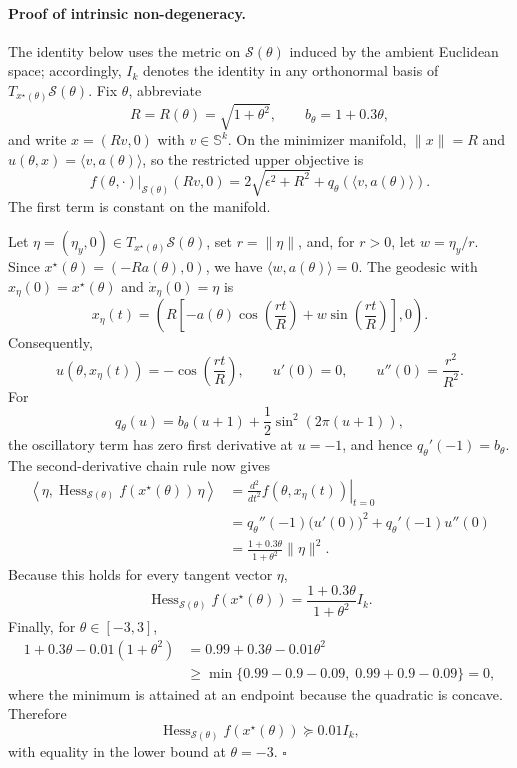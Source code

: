 \paragraph{Proof of intrinsic non-degeneracy.}
The identity below uses the metric on \(\mathcal S(\theta)\) induced by the
ambient Euclidean space; accordingly, \(I_k\) denotes the identity in any
orthonormal basis of
\(T_{x^\star(\theta)}\mathcal S(\theta)\).  Fix \(\theta\), abbreviate
\[
R=R(\theta)=\sqrt{1+\theta^2},
\qquad
b_\theta=1+0.3\theta,
\]
and write \(x=(Rv,0)\) with \(v\in\mathbb S^k\).  On the minimizer
manifold, \(\lVert x\rVert=R\) and
\(u(\theta,x)=\langle v,a(\theta)\rangle\), so the restricted upper objective
is
\[
\left.f(\theta,\cdot)\right|_{\mathcal S(\theta)}(Rv,0)
=2\sqrt{\epsilon^2+R^2}
+q_\theta\!\left(\langle v,a(\theta)\rangle\right).
\]
The first term is constant on the manifold.

Let
\(\eta=(\eta_y,0)\in T_{x^\star(\theta)}\mathcal S(\theta)\), set
\(r=\lVert\eta\rVert\), and, for \(r>0\), let \(w=\eta_y/r\).  Since
\(x^\star(\theta)=(-Ra(\theta),0)\), we have
\(\langle w,a(\theta)\rangle=0\).  The geodesic with
\(x_\eta(0)=x^\star(\theta)\) and \(\dot x_\eta(0)=\eta\) is
\[
x_\eta(t)
=\left(
R\left[
-a(\theta)\cos\!\left(\frac{rt}{R}\right)
+w\sin\!\left(\frac{rt}{R}\right)
\right],0
\right).
\]
Consequently,
\[
u(\theta,x_\eta(t))
=-\cos\!\left(\frac{rt}{R}\right),
\qquad
u'(0)=0,
\qquad
u''(0)=\frac{r^2}{R^2}.
\]
For
\[
q_\theta(u)
=b_\theta(u+1)
+\frac12\sin^2\!\left(2\pi(u+1)\right),
\]
the oscillatory term has zero first derivative at \(u=-1\), and hence
\(q_\theta'(-1)=b_\theta\).  The second-derivative chain rule now gives
\[
\begin{aligned}
\left\langle
\eta,\operatorname{Hess}_{\mathcal S(\theta)}
f(x^\star(\theta))\,\eta
\right\rangle
&=
\left.\frac{d^2}{dt^2}f(\theta,x_\eta(t))\right|_{t=0}\\
&=
q_\theta''(-1)\bigl(u'(0)\bigr)^2
+q_\theta'(-1)u''(0)\\
&=
\frac{1+0.3\theta}{1+\theta^2}\lVert\eta\rVert^2.
\end{aligned}
\]
Because this holds for every tangent vector \(\eta\),
\[
\operatorname{Hess}_{\mathcal S(\theta)}f(x^\star(\theta))
=\frac{1+0.3\theta}{1+\theta^2}I_k.
\]
Finally, for \(\theta\in[-3,3]\),
\[
\begin{aligned}
1+0.3\theta-0.01(1+\theta^2)
&=0.99+0.3\theta-0.01\theta^2\\
&\geq
\min\{0.99-0.9-0.09,\;0.99+0.9-0.09\}=0,
\end{aligned}
\]
where the minimum is attained at an endpoint because the quadratic is
concave.  Therefore
\[
\operatorname{Hess}_{\mathcal S(\theta)}f(x^\star(\theta))
\succeq0.01I_k,
\]
with equality in the lower bound at \(\theta=-3\).
\hfill\(\square\)
